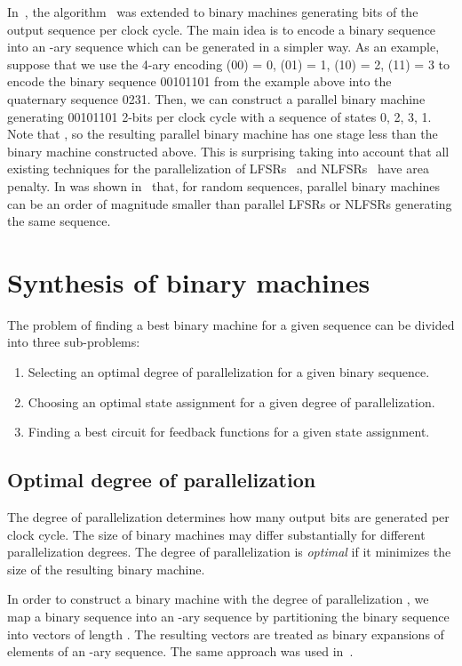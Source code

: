 \documentclass[10pt,conference]{IEEEtran}
\begin{document}
In~\cite{Du11a}, the algorithm~\cite{Du10aj} was extended to binary machines generating  bits 
of the output sequence per clock cycle. 
The main idea is to encode a binary sequence into an -ary sequence which can be 
generated in a simpler way. As an example,
suppose that we use the 4-ary encoding (00) = 0, (01) = 1, (10) = 2, (11) = 3
to encode the binary sequence 00101101 from the example above into
the  quaternary sequence 0231.
Then, we can construct a parallel binary machine generating 00101101 2-bits per clock cycle with a sequence 
of states 0, 2, 3, 1. Note that , so the resulting parallel binary machine has one stage
less than the binary machine constructed above. 
This is surprising taking into account that all existing techniques for the 
parallelization of LFSRs~\cite{PeZ92,MuS06} and NLFSRs~\cite{canniere-trivium,hell-grain} have area penalty.
In was shown in~\cite{Du11a} that, for random sequences,  
parallel binary machines can be an order of magnitude smaller than parallel LFSRs or NLFSRs generating the same sequence.
 
\section{Synthesis of binary machines} \label{sa1}

The problem of finding a best binary machine for a given sequence can be divided into
three sub-problems:
\begin{enumerate}
\item Selecting an optimal degree of parallelization for a given binary sequence.
\item Choosing an optimal state assignment for a given degree of parallelization.
\item Finding a best circuit for feedback functions for a given state assignment. 
\end{enumerate}

\subsection{Optimal degree of parallelization}

The degree of parallelization determines how many output bits are
generated per clock cycle. 
The size of binary machines may differ substantially for different 
parallelization degrees.
The degree of parallelization is {\em optimal} if it minimizes the size 
of the resulting binary machine. 

In order to construct a binary machine with the degree of parallelization 
, we map a binary sequence into an -ary sequence by
partitioning the binary sequence into vectors of length .
The resulting vectors are treated as binary expansions of elements 
of an -ary sequence. The same approach was used in~\cite{Du11a}. 
\end{document}

